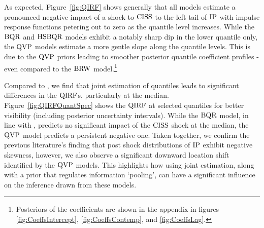 
%
As expected, Figure~\ref{fig:QIRF} shows generally that all models estimate a pronounced negative impact of a shock to $\operatorname{CISS}$ to the left tail of $\operatorname{IP}$ with impulse response functions petering out to zero as the quantile level increases.
%
While the $\operatorname{BQR}$ and $\operatorname{HSBQR}$ models exhibit a notably sharp dip in the lower quantile only, the $\operatorname{QVP}$ models estimate a more gentle slope along the quantile levels. This is due to the $\operatorname{QVP}$ priors leading to smoother posterior quantile coefficient profiles - even compared to the $\operatorname{BRW}$ model.\footnote{Posteriors of the coefficients are shown in the appendix in figures \ref{fig:CoeffsIntercept}, \ref{fig:CoeffsContemp}, and \ref{fig:CoeffsLag}.}


Compared to \citet{chavleishvili2024forecasting}, we find that joint estimation of quantiles leads to significant differences in the $\operatorname{QIRF}$s, particularly at the median. Figure~\ref{fig:QIRFQuantSpec} shows the $\operatorname{QIRF}$ at selected quantiles for better visibility (including posterior uncertainty intervals). While the $\operatorname{BQR}$ model, in line with \citet{chavleishvili2024forecasting}, predicts no significant impact of the $\operatorname{CISS}$ shock at the median, the $\operatorname{QVP}$ model predicts a persistent negative one. Taken together, we confirm the previous literature's finding that post shock distributions of $\operatorname{IP}$ exhibit negative skewness, however, we also observe a significant downward location shift identified by the $\operatorname{QVP}$ models.  This highlights how using joint estimation, along with a prior that regulates information `pooling', can have a significant influence on the inference drawn from these models.

